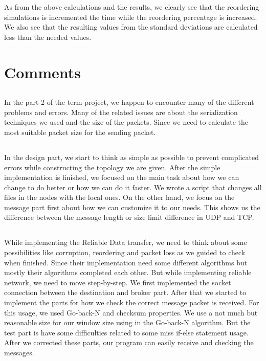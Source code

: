 \documentclass[conference]{IEEEtran}
\begin{document}
As from the above calculations and the results, we clearly see that the reordering simulations is incremented the time while the reordering percentage is increased. We also see that the resulting values from the standard deviations are calculated less than the needed values.

\section*{Comments}

\subsection*{}
In the part-2 of the term-project, we happen to encounter many of the different problems and errors. Many of the related issues are about the serialization techniques we used and the size of the packets. Since we need to calculate the most suitable packet size for the sending packet.

\subsection*{}
In the design part, we start to think as simple as possible to prevent complicated errors while constructing the topology we are given. After the simple implementation is finished, we focused on the main task about how we can change to do better or how we can do it faster. We wrote a script that changes all files in the nodes with the local ones. On the other hand, we focus on the message part first about how we can customize it to our needs. This shows us the difference between the message length or size limit difference in UDP and TCP. 

\subsection*{}

While implementing the Reliable Data transfer, we need to think about some possibilities like corruption, reordering and packet loss as we guided to check when finished. Since their implementation need some different algorithms but mostly their algorithms completed each other. But while implementing reliable network, we need to move step-by-step. We first implemented the socket connection between the destination and broker part. After that we started to implement the parts for how we check the correct message packet is received. For this usage, we used Go-back-N and checksum properties. We use a not much but reasonable size for our window size using in the Go-back-N algorithm. But the test part is have some difficulties related to some miss if-else statement usage. After we corrected these parts, our program can easily receive and checking the messages.
\end{document}
